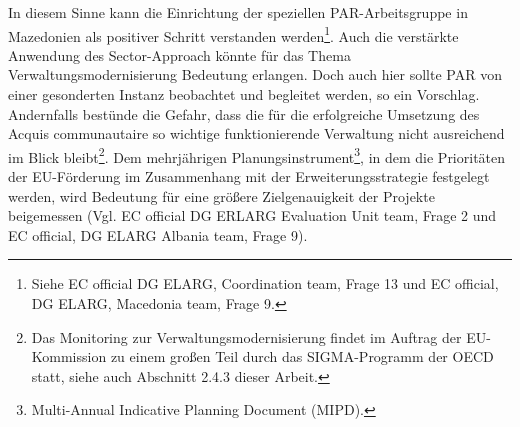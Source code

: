 In diesem Sinne kann die Einrichtung der speziellen PAR-Arbeitsgruppe in Mazedonien als positiver Schritt verstanden werden\footnote{Siehe EC official DG ELARG, Coordination team, Frage 13 und EC official, DG ELARG, Macedonia team, Frage 9.}. Auch die verstärkte Anwendung des Sector-Approach könnte für das Thema Verwaltungsmodernisierung Bedeutung erlangen. Doch auch hier sollte PAR von einer gesonderten Instanz beobachtet und begleitet werden, so ein Vorschlag. Andernfalls bestünde die Gefahr, dass die für die erfolgreiche Umsetzung des Acquis communautaire so wichtige funktionierende Verwaltung nicht ausreichend im Blick bleibt\footnote{Das Monitoring zur Verwaltungsmodernisierung findet im Auftrag der EU-Kommission zu einem großen Teil durch das SIGMA-Programm der OECD statt, siehe auch Abschnitt 2.4.3 dieser Arbeit.}. Dem mehrjährigen Planungsinstrument\footnote{Multi-Annual Indicative Planning Document (MIPD).}, in dem die Prioritäten der EU-Förderung im Zusammenhang mit der Erweiterungsstrategie festgelegt werden, wird Bedeutung für eine größere Zielgenauigkeit der Projekte beigemessen (Vgl. EC official DG ERLARG Evaluation Unit team, Frage 2 und EC official, DG ELARG Albania team, Frage 9).

